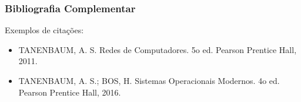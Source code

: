\begin{frame}[t]\frametitle{Bibliografia Complementar}

  Exemplos de citações:
  \begin{itemize}
    \justifying{}
    \setlength\itemsep{1em}
    \item TANENBAUM, A. S. Redes de Computadores. 5o ed. Pearson Prentice Hall, 2011. \cite{Tanenbaum2011}
    \item TANENBAUM, A. S.; BOS, H. Sistemas Operacionais Modernos. 4o ed. Pearson Prentice Hall, 2016. \cite{Tanenbaum2016}
  \end{itemize}

\end{frame}
